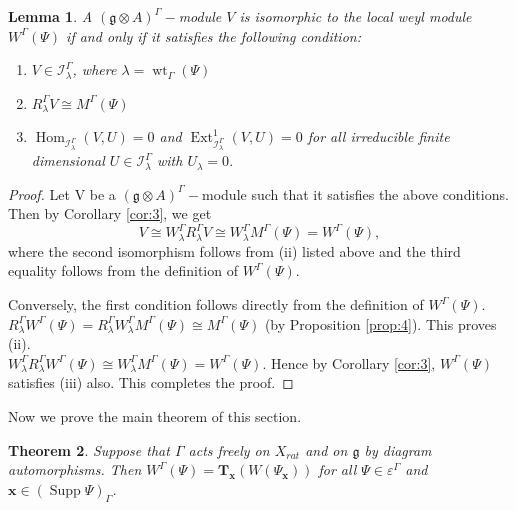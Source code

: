 \documentclass[11pt]{amsart}
\theoremstyle{plain}
\newtheorem{thm}{Theorem}[section]
\newtheorem{lemma}[thm]{Lemma}
\theoremstyle{definition}
\newcommand{\g}{\mathfrak{g}}
\DeclareMathOperator{\Hom}{Hom}
\DeclareMathOperator{\Ext}{Ext}
\DeclareMathOperator{\Supp}{Supp}
\DeclareMathOperator{\wt}{wt}
\begin{document}
\begin{lemma}\label{lem:11}
    A $(\g\otimes A)^{\Gamma}-$module $V$ is isomorphic to the local weyl module $W^{\Gamma}(\Psi)$ if and only if it satisfies the following condition:
    \begin{enumerate}[label=(\alph*)]
        \item $V\in\mathcal{I}_{\lambda}^{\Gamma}$, where $\lambda=\wt_{\Gamma}(\Psi)$
        \item $R_{\lambda}^{\Gamma}V\cong M^{\Gamma}(\Psi)$
        \item $\Hom_{\mathcal{I}_{\lambda}^{\Gamma}}(V,U)=0$ and $\Ext^{1}_{\mathcal{I}_{\lambda}^{\Gamma}}(V,U)=0$ for all irreducible finite dimensional $U\in\mathcal{I}_{\lambda}^{\Gamma}$ with $U_{\lambda}=0$.
    \end{enumerate}
\end{lemma}
\begin{proof}
Let V be a $(\g\otimes A)^{\Gamma}-$module such that it satisfies the above conditions. Then by Corollary \ref{cor:3}, we get 
\begin{equation*}
V\cong W_{\lambda}^{\Gamma}R_{\lambda}^{\Gamma}V\cong W_{\lambda}^{\Gamma}M^{\Gamma}(\Psi)=W^{\Gamma}(\Psi),
\end{equation*}
where the second isomorphism follows from (ii) listed above and the third equality follows from the definition of $W^{\Gamma}(\Psi)$.
     
Conversely, the first condition follows directly from the definition of $W^{\Gamma}(\Psi)$. $R_{\lambda}^{\Gamma}W^{\Gamma}(\Psi)=R_{\lambda}^{\Gamma}W_{\lambda}^{\Gamma}M^{\Gamma}(\Psi)\cong M^{\Gamma}(\Psi)$ (by Proposition \ref{prop:4}). This proves (ii).\\ $W_{\lambda}^{\Gamma}R_{\lambda}^{\Gamma}W^{\Gamma}(\Psi)\cong W_{\lambda}^{\Gamma}M^{\Gamma}(\Psi)= W^{\Gamma}(\Psi)$. Hence by Corollary \ref{cor:3}, $W^{\Gamma}(\Psi)$ satisfies (iii) also. This completes the proof.
\end{proof}
Now we prove the main theorem of this section.
\begin{thm}
Suppose that $\Gamma$ acts freely on $X_{rat}$ and on $\g$ by diagram automorphisms. Then $W^{\Gamma}(\Psi)=\textbf{T}_{\mathbf{x}}(W({\Psi}_{\mathbf{x}}))$ for all $\Psi\in\varepsilon^{\Gamma}$ and $\mathbf{x}\in (\Supp\Psi)_{\Gamma}$. 
\end{thm}
\end{document}
